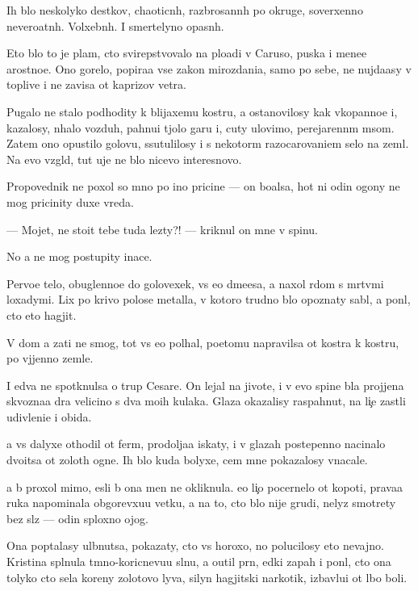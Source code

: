 \documentclass[10pt]{book}
\begin{document}
Ih b{\yi}lo neskolyko des{\ia}tkov, chaoticn{\yi}h, razbrosann{\yi}h po okruge, soverxenno nevero{\y}atn{\yi}h. Volxebn{\yi}h. I smertelyno opasn{\yi}h.

Eto b{\yi}lo to je plam{\ia}, cto svirepstvovalo na plo{\x}adi v Caruso, puska{\y} i mene{\y}e {\y}arostno{\y}e. Ono gorelo, popira{\y}a vse zakon{\yi} mirozdani{\y}a, samo po sebe, ne nujda{\y}asy v toplive i ne zavisa ot kaprizov vetra.

Pugalo ne stalo podhodity k blija{\y}xemu kostru, a ostanovilosy kak vkopanno{\y}e i, kazalosy, n{\io}halo vozduh, pahnu{\x}i{\y} t{\ia}jolo{\y} gar{\y}u i, cuty ulovimo, perejarenn{\yi}m m{\ia}som. Zatem ono opustilo golovu, ssutulilosy i s nekotor{\yi}m razocarovani{\y}em selo na zeml{\io}. Na {\y}evo vzgl{\ia}d, tut uje ne b{\yi}lo nicevo interesnovo.

Pro\-po\-ved\-nik ne poxol so mno{\y} po ino{\y} pricine — on bo{\y}alsa, hot{\ia} ni odin ogony ne mog pricinity duxe vreda.

— Mojet, ne stoit tebe tuda lezty?! — kriknul on mne v spinu.

No {\y}a ne mog postupity inace.

Pervo{\y}e telo, obuglenno{\y}e do golovexek, vs{\e} {\y}e{\x}o d{\yi}m{\ia}{\x}e{\y}esa, {\y}a naxol r{\ia}dom s m{\e}rtv{\yi}mi lo\-xady\-mi. Lix po krivo{\y} polose metalla, v kotoro{\y} trudno b{\yi}lo opoznaty sabl{\io}, {\y}a pon{\ia}l, cto eto hagjit.

V dom {\y}a za{\y}ti ne smog, tot vs{\e} {\y}e{\x}o pol{\yi}hal, poetomu napravilsa ot kostra k kostru, po v{\yi}jjenno{\y} zemle.

I {\y}edva ne spotknulsa o trup Cesare. On lejal na jivote, i v {\y}evo spine b{\yi}la projjena skvozna{\y}a d{\yi}ra velicino{\y} s dva mo{\y}ih kulaka. Glaza okazalisy raspahnut{\yi}, na li{\c}e zast{\yi}li udivleni{\y}e i obida.

{\Y}a vs{\e} dalyxe othodil ot ferm{\yi}, prodolja{\y}a iskaty, i v glazah postepenno nacinalo dvo{\y}itsa ot zolot{\yi}h ogne{\y}. Ih b{\yi}lo kuda bolyxe, cem mne pokazalosy vnacale.

{\Y}a b{\yi} proxol mimo, {\y}esli b{\yi} ona men{\ia} ne okliknula. {\Y}e{\y}o li{\c}o pocernelo ot kopoti, prava{\y}a ruka napominala obgorevxu{\y}u vetku, a na to, cto b{\yi}lo nije grudi, nelyz{\ia} smotrety bez sl{\e}z — odin sploxno{\y} ojog.

Ona pop{\yi}talasy ul{\yi}bnutsa, pokazaty, cto vs{\e} horoxo, no polucilosy eto ne\-vaj\-no. Kristina spl{\io}nula t{\e}mno-koricnevu{\y}u sl{\io}nu, {\y}a o{\x}util pr{\ia}n{\yi}{\y}, {\y}edki{\y} zapah i pon{\ia}l, cto ona tolyko cto s{\y}ela koreny zolotovo lyva, silyn{\yi}{\y} hagjitski{\y} narkotik, izbavl{\ia}{\y}u{\x}i{\y} ot l{\io}bo{\y} boli.
\end{document}
